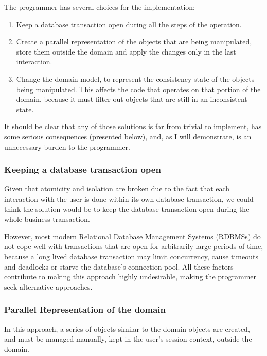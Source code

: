 \documentclass{llncs}
\begin{document}
The programmer has several choices for the implementation:

\begin{enumerate}
\item Keep a database transaction open during all the steps of the
  operation.

\item Create a parallel representation of the objects that are being
  manipulated, store them outside the domain and apply the changes
  only in the last interaction.

\item Change the domain model, to represent the consistency state of
  the objects being manipulated. This affects the code that operates
  on that portion of the domain, because it must filter out objects
  that are still in an inconsistent state.
\end{enumerate}

It should be clear that any of those solutions is far from trivial to
implement, has some serious consequences (presented below), and, as I
will demonstrate, is an unnecessary burden to the programmer.

\subsubsection{Keeping a database transaction open}

Given that atomicity and isolation are broken due to the fact that
each interaction with the user is done within its own database
transaction, we could think the solution would be to keep the database
transaction open during the whole business transaction.

However, most modern Relational Database Management Systems (RDBMSs)
do not cope well with transactions that are open for arbitrarily large
periods of time, because a long lived database transaction may limit
concurrency, cause timeouts and deadlocks or starve the database's
connection pool. All these factors contribute to making this approach
highly undesirable, making the programmer seek alternative approaches.

\subsubsection{Parallel Representation of the domain}

In this approach, a series of objects similar to the domain objects
are created, and must be managed manually, kept in the user's session
context, outside the domain.
\end{document}
